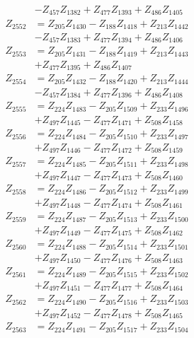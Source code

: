 \begin{multicols}{2}
\begin{align}
&- Z_{457}Z_{1382} + Z_{477}Z_{1393} + Z_{486}Z_{1405} \nonumber \\
Z_{2552} &= Z_{205}Z_{1430} - Z_{188}Z_{1418} + Z_{213}Z_{1442}  \nonumber \\
&- Z_{457}Z_{1383} + Z_{477}Z_{1394} + Z_{486}Z_{1406} \nonumber \\
Z_{2553} &= Z_{205}Z_{1431} - Z_{188}Z_{1419} + Z_{213}Z_{1443}  \nonumber \\
&+ Z_{477}Z_{1395} + Z_{486}Z_{1407} \nonumber \\
Z_{2554} &= Z_{205}Z_{1432} - Z_{188}Z_{1420} + Z_{213}Z_{1444}  \nonumber \\
&- Z_{457}Z_{1384} + Z_{477}Z_{1396} + Z_{486}Z_{1408} \nonumber \\
Z_{2555} &= Z_{224}Z_{1483} - Z_{205}Z_{1509} + Z_{233}Z_{1496}  \nonumber \\
&+ Z_{497}Z_{1445} - Z_{477}Z_{1471} + Z_{508}Z_{1458} \nonumber \\
Z_{2556} &= Z_{224}Z_{1484} - Z_{205}Z_{1510} + Z_{233}Z_{1497}  \nonumber \\
&+ Z_{497}Z_{1446} - Z_{477}Z_{1472} + Z_{508}Z_{1459} \nonumber \\
Z_{2557} &= Z_{224}Z_{1485} - Z_{205}Z_{1511} + Z_{233}Z_{1498}  \nonumber \\
&+ Z_{497}Z_{1447} - Z_{477}Z_{1473} + Z_{508}Z_{1460} \nonumber \\
Z_{2558} &= Z_{224}Z_{1486} - Z_{205}Z_{1512} + Z_{233}Z_{1499}  \nonumber \\
&+ Z_{497}Z_{1448} - Z_{477}Z_{1474} + Z_{508}Z_{1461} \nonumber \\
Z_{2559} &= Z_{224}Z_{1487} - Z_{205}Z_{1513} + Z_{233}Z_{1500}  \nonumber \\
&+ Z_{497}Z_{1449} - Z_{477}Z_{1475} + Z_{508}Z_{1462} \nonumber \\
Z_{2560} &= Z_{224}Z_{1488} - Z_{205}Z_{1514} + Z_{233}Z_{1501}  \nonumber \\
&+ Z_{497}Z_{1450} - Z_{477}Z_{1476} + Z_{508}Z_{1463} \nonumber \\
Z_{2561} &= Z_{224}Z_{1489} - Z_{205}Z_{1515} + Z_{233}Z_{1502}  \nonumber \\
&+ Z_{497}Z_{1451} - Z_{477}Z_{1477} + Z_{508}Z_{1464} \nonumber \\
Z_{2562} &= Z_{224}Z_{1490} - Z_{205}Z_{1516} + Z_{233}Z_{1503}  \nonumber \\
&+ Z_{497}Z_{1452} - Z_{477}Z_{1478} + Z_{508}Z_{1465} \nonumber \\
Z_{2563} &= Z_{224}Z_{1491} - Z_{205}Z_{1517} + Z_{233}Z_{1504}  \nonumber \\

\end{align}
\end{multicols}
